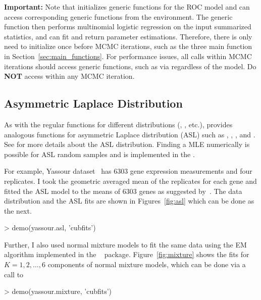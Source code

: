{\color{red} \bf Important:}
Note that  initializes generic functions
for the ROC model and  can access corresponding generic
functions from the  environment. The generic function then
performs multinomial logistic regression on the input summarized statistics,
and  can fit and return parameter estimations.
Therefore, there is only need to initialize once before MCMC iterations, such as
the three main function in Section~\ref{sec:main_functions}. For performance
issues, all calls within MCMC iterations should access generic functions, such
as via  regardless of the model. Do \textbf{NOT}
access  within any MCMC iteration. %




\subsection[Asymmetric Laplace Distribution]{Asymmetric Laplace Distribution}
\label{sec:asl}

As with the regular  functions for different distributions 
(, , etc.),
 provides analogous functions for asymmetric Laplace distribution
(ASL) such as , , , and .
See \citep{KKP2001} for more details about the ASL distribution.
Finding a MLE numerically is possible for ASL random samples and
is implemented in the .

For example,
Yassour dataset~\citep{Yassour2009} has 6303 gene expression measurements and
four replicates.
I took the geometric averaged mean of the replicates for each gene and
fitted the ASL model to the means of 6303 genes as suggested
by~\cite{Wallace2013}.
The data distribution and the ASL fits are shown
in Figures~\ref{fig:asl} which can be done as the next.
\begin{Code}
> demo(yassour.asl, 'cubfits')
\end{Code}

Further, I also used normal mixture models to fit the same data using the EM
algorithm implemented in the ~\citep{EMCluster} package.
Figure~\ref{fig:mixture} shows the fits
for $K = 1, 2,\ldots, 6$ components of normal mixture models,
which can be done via a call to
\begin{Code}
> demo(yassour.mixture, 'cubfits')
\end{Code}

